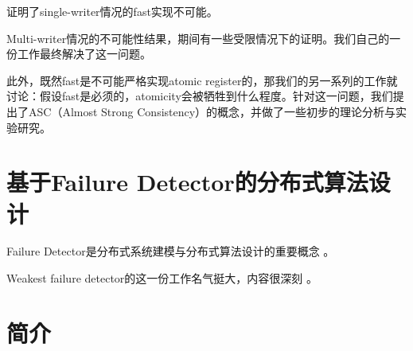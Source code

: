 \documentclass[UTF8]{ctexrep}
\begin{document}
\cite{Dutta10}证明了single-writer情况的fast实现不可能。

Multi-writer情况的不可能性结果，期间有一些受限情况下的证明。我们自己的一份工作最终解决了这一问题\cite{Huang20}。

此外，既然fast是不可能严格实现atomic register的，那我们的另一系列的工作就讨论：假设fast是必须的，atomicity会被牺牲到什么程度。针对这一问题，我们提出了ASC（Almost Strong Consistency）的概念，并做了一些初步的理论分析与实验研究\cite{Wei17, Ouyang21}。


\chapter{基于Failure Detector的分布式算法设计}

Failure Detector是分布式系统建模与分布式算法设计的重要概念 \cite{Chandra96unreliable}。

Weakest failure detector的这一份工作名气挺大，内容很深刻 \cite{Chandra96weakest}。



\appendix

\chapter{\tla 简介} \label{Appen:TLA}

\end{document}
